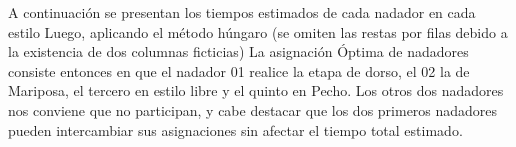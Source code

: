 
\begin{homeworkProblem}
A continuación se presentan los tiempos estimados de cada nadador en cada estilo
Luego, aplicando el método húngaro (se omiten las restas por filas debido a la existencia de dos columnas ficticias)
La asignación Óptima de nadadores consiste entonces en que el nadador 01 realice la etapa de dorso, el 02 la de Mariposa, el tercero en estilo libre y el quinto en Pecho. Los otros dos nadadores nos conviene que no participan, y cabe destacar que los dos primeros nadadores pueden intercambiar sus asignaciones sin afectar el tiempo total estimado.
\end{homeworkProblem}


